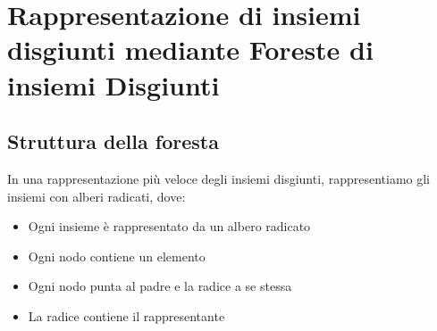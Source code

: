\chapter{Rappresentazione di insiemi disgiunti mediante Foreste di insiemi Disgiunti}

\section{Struttura della foresta}
In una rappresentazione più veloce degli insiemi disgiunti, rappresentiamo gli insiemi con alberi radicati, dove:
\begin{itemize}
    \item Ogni insieme è rappresentato da un albero radicato
    \item Ogni nodo contiene un elemento
    \item Ogni nodo punta al padre e la radice a se stessa
    \item La radice contiene il rappresentante
\end{itemize}

